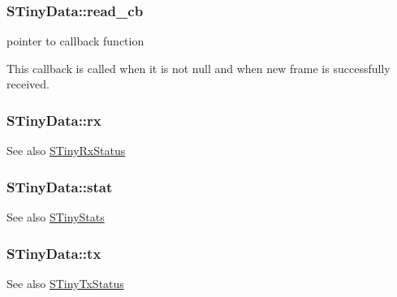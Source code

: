 \subsubsection[{read\+\_\+cb}]{ S\+Tiny\+Data\+::read\+\_\+cb}\label{structSTinyData_a31ba50154472c11e0d063b0aeef95f4d}


pointer to callback function 

This callback is called when it is not null and when new frame is successfully received. \hypertarget{structSTinyData_aa3b43db99a1a6bf3d562f932d5a539db}{}
\subsubsection[{rx}]{ S\+Tiny\+Data\+::rx}\label{structSTinyData_aa3b43db99a1a6bf3d562f932d5a539db}
\begin{DoxySeeAlso}{See also}
\hyperlink{structSTinyRxStatus}{S\+Tiny\+Rx\+Status} 
\end{DoxySeeAlso}
\hypertarget{structSTinyData_a16ba8c9e60d6aee3fcd4909f85561f3d}{}
\subsubsection[{stat}]{ S\+Tiny\+Data\+::stat}\label{structSTinyData_a16ba8c9e60d6aee3fcd4909f85561f3d}
\begin{DoxySeeAlso}{See also}
\hyperlink{structSTinyStats}{S\+Tiny\+Stats} 
\end{DoxySeeAlso}
\hypertarget{structSTinyData_aa099adb35f3494332747eb18851fbb23}{}
\subsubsection[{tx}]{ S\+Tiny\+Data\+::tx}\label{structSTinyData_aa099adb35f3494332747eb18851fbb23}
\begin{DoxySeeAlso}{See also}
\hyperlink{structSTinyTxStatus}{S\+Tiny\+Tx\+Status} 
\end{DoxySeeAlso}
\hypertarget{structSTinyData_ada334c88e86bfd2c10191f65818c3fb3}{}
